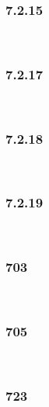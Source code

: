 \subsubsection{7.2.15}\hfill\\\par
\par\bigskip
\subsubsection{7.2.17}\hfill\\\par
\par\bigskip
\subsubsection{7.2.18}\hfill\\\par
\par\bigskip
\subsubsection{7.2.19}\hfill\\\par
\par\bigskip
\subsubsection{703}\hfill\\\par
\par\bigskip
\subsubsection{705}\hfill\\\par
\par\bigskip
\subsubsection{723}\hfill\\\par
\par\bigskip

